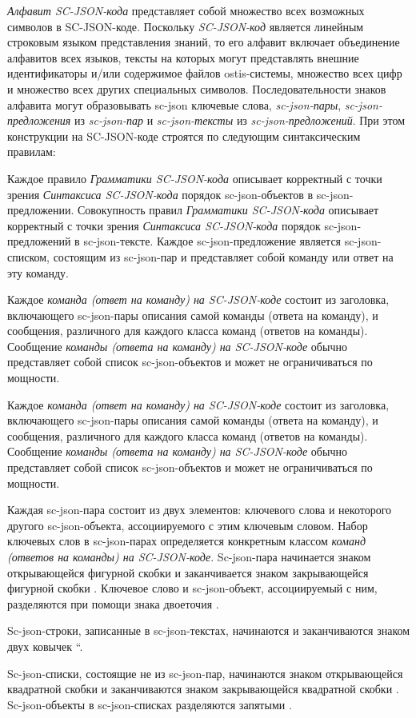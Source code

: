 \begin{scnitemize}
\textit{Алфавит SC-JSON-кода\scnsupergroupsign} представляет собой множество всех возможных символов в SC-JSON-коде.
Поскольку \textit{SC-JSON-код} является линейным строковым языком представления знаний, то его алфавит включает
объединение алфавитов всех языков, тексты на которых могут представлять внешние идентификаторы и/или содержимое файлов ostis-системы,
множество всех цифр и множество всех других специальных символов. Последовательности знаков алфавита могут образовывать
sc-json ключевые слова, \textit{sc-json-пары}, \textit{sc-json-предложения} из \textit{sc-json-пар} и
\textit{sc-json-тексты} из \textit{sc-json-предложений}. При этом конструкции на SC-JSON-коде строятся по следующим
синтаксическим правилам:
\begin{scnitemize}
    \item Каждое правило \textit{Грамматики SC-JSON-кода} описывает корректный с точки зрения \textit{Синтаксиса
    SC-JSON-кода} порядок sc-json-объектов в sc-json-предложении. Совокупность правил \textit{Грамматики SC-JSON-кода}
    описывает корректный с точки зрения \textit{Синтаксиса SC-JSON-кода} порядок sc-json-предложений в sc-json-тексте.
    Каждое sc-json-предложение является sc-json-списком, состоящим из sc-json-пар и представляет собой команду или ответ
    на эту команду.
    \item Каждое \textit{команда (ответ на команду) на SC-JSON-коде} состоит из заголовка, включающего sc-json-пары
    описания самой команды (ответа на команду), и сообщения, различного для каждого класса команд (ответов на команды).
    Сообщение \textit{команды (ответа на команду) на SC-JSON-коде} обычно представляет собой список sc-json-объектов и
    может не ограничиваться по мощности.
    \item Каждое \textit{команда (ответ на команду) на SC-JSON-коде} состоит из заголовка, включающего sc-json-пары
    описания самой команды (ответа на команду), и сообщения, различного для каждого класса команд (ответов на команды).
    Сообщение \textit{команды (ответа на команду) на SC-JSON-коде} обычно представляет собой список sc-json-объектов и
    может не ограничиваться по мощности.
    \item Каждая sc-json-пара состоит из двух элементов: ключевого слова и некоторого другого sc-json-объекта,
    ассоциируемого с этим ключевым словом. Набор ключевых слов в sc-json-парах определяется конкретным классом
    \textit{команд (ответов на команды) на SC-JSON-коде}. Sc-json-пара начинается знаком открывающейся фигурной скобки
    \scnqq{\{} и заканчивается знаком закрывающейся фигурной скобки \scnqq{\}}. Ключевое слово и sc-json-объект,
    ассоциируемый с ним, разделяются при помощи знака двоеточия \scnqq{:}.
    \item Sc-json-строки, записанные в sc-json-текстах, начинаются и заканчиваются знаком двух ковычек \textquotedblleft.
    \item Sc-json-списки, состоящие не из sc-json-пар, начинаются знаком открывающейся квадратной скобки \scnqq{[} и
    заканчиваются знаком закрывающейся квадратной скобки \scnqq{]}. Sc-json-объекты в sc-json-списках разделяются
    запятыми \scnqq{,}.
\end{scnitemize}


\end{scnitemize}
